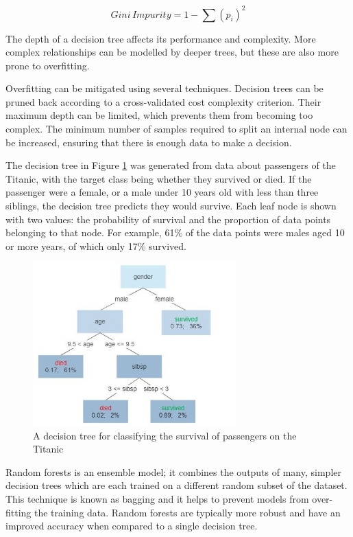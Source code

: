 \[ Gini\, Impurity = 1 - \sum (p_i)^2 \]

The depth of a decision tree affects its performance and complexity. More complex relationships can be modelled by deeper trees, but these are also more prone to overfitting. 

Overfitting can be mitigated using several techniques. Decision trees can be pruned back according to a cross-validated cost complexity criterion. Their maximum depth can be limited, which prevents them from becoming too complex. The minimum number of samples required to split an internal node can be increased, ensuring that there is enough data to make a decision.

The decision tree in Figure \ref{fig:tree} was generated from data about passengers of the Titanic, with the target class being whether they survived or died. If the passenger were a female, or a male under 10 years old with less than three siblings, the decision tree predicts they would survive. Each leaf node is shown with two values: the probability of survival and the proportion of data points belonging to that node. For example, 61\% of the data points were males aged 10 or more years, of which only 17\% survived.

\begin{figure}[h]
	\centering
	\includegraphics[width=0.7\textwidth]{Figures/decision-tree.jpg}
	\caption{A decision tree for classifying the survival of passengers on the Titanic \cite{fig-tree}}
	\label{fig:tree}
\end{figure}

Random forests is an ensemble model; it combines the outputs of many, simpler decision trees which are each trained on a different random subset of the dataset. This technique is known as bagging and it helps to prevent models from over-fitting the training data. Random forests are typically more robust and have an improved accuracy when compared to a single decision tree. 

